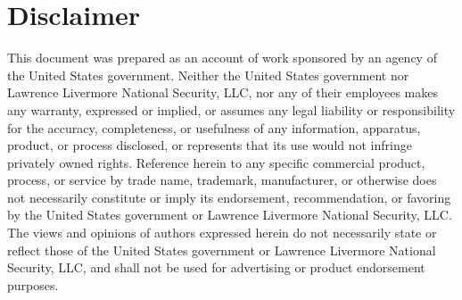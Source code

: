 \documentclass[11pt]{article}
\begin{document}
\section{Disclaimer} 
This document was prepared as an account of work sponsored by an agency of the United States
government. Neither the United States government nor Lawrence Livermore National Security, LLC, nor
any of their employees makes any warranty, expressed or implied, or assumes any legal liability or
responsibility for the accuracy, completeness, or usefulness of any information, apparatus, product,
or process disclosed, or represents that its use would not infringe privately owned
rights. Reference herein to any specific commercial product, process, or service by trade name,
trademark, manufacturer, or otherwise does not necessarily constitute or imply its endorsement,
recommendation, or favoring by the United States government or Lawrence Livermore National Security,
LLC. The views and opinions of authors expressed herein do not necessarily state or reflect those of
the United States government or Lawrence Livermore National Security, LLC, and shall not be used for
advertising or product endorsement purposes. 



 
\end{document}
